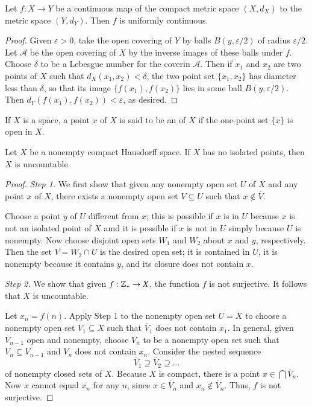 \documentclass[12pt, a4paper, oneside, openright, titlepage]{book}
\begin{document}
\begin{theorem}
    Let $f:X\rightarrow Y$ be a continuous map of the compact metric space $(X,d_X)$ to the metric space $(Y,d_Y)$. Then $f$ is uniformly continuous.
\end{theorem}
\begin{proof}
    Given $\varepsilon >0$, take the open covering of $Y$ by balls $B(y,\varepsilon/2)$ of radius $\varepsilon/2$. Let $\mathcal{A}$ be the open covering of $X$ by the inverse images of these balls under $f$. Choose $\delta$ to be a Lebesgue number for the coverin $\mathcal{A}$. Then if $x_1$ and $x_2$ are two points of $X$ such that $d_X(x_1,x_2) < \delta$, the two point set $\{x_1,x_2\}$ has diameter less than $\delta$, so that its image $\{f(x_1),f(x_2)\}$ lies in some ball $B(y,\varepsilon/2)$. Then $d_Y(f(x_1),f(x_2)) < \varepsilon$, as desired.
\end{proof}

\begin{definition}
    If $X$ is a space, a point $x$ of $X$ is said to be an  of $X$ if the one-point set $\{x\}$ is open in $X$.
\end{definition}


\begin{theorem}
    Let $X$ be a nonempty compact Hausdorff space. If $X$ has no isolated points, then $X$ is uncountable.
\end{theorem}
\begin{proof}
    \emph{Step 1.} We first show that given any nonempty open set $U$ of $X$ and any point $x$ of $X$, there exists a nonempty open set $V \subseteq U$ such that $x \notin \overline{V}$.

    Choose a point $y$ of $U$ different from $x$; this is possible if $x$ is in $U$ because $x$ is not an isolated point of $X$ amd it is possible if $x$ is not in $U$ simply because $U$ is nonempty. Now choose disjoint open sets $W_1$ and $W_2$ about $x$ and $y$, respectively. Then the set $V = W_2 \cap U$ is the desired open set; it is contained in $U$, it is nonempty because it contains $y$, and its closure does not contain $x$.

    \emph{Step 2.} We show that given $f:\mathbb Z_+\rightarrow X$, the function $f$ is not surjective. It follows that $X$ is uncountable.

    Let $x_n = f(n)$. Apply Step 1 to the nonempty open set $U = X$ to choose a nonempty open set $V_1 \subseteq X$ such that $\overline{V}_1$ does not contain $x_1$. In general, given $V_{n-1}$ open and nonempty, choose $V_n$ to be a nonempty open set such that $V_n \subseteq V_{n-1}$ and $V_n$ does not contain $x_n$. Consider the nested sequence \begin{equation*}
        \overline{V}_1\supseteq \overline{V}_2\supseteq ...
    \end{equation*}
    of nonempty closed sets of $X$. Because $X$ is compact, there is a point $x \in \bigcap\overline{V}_n$. Now $x$ cannot equal $x_n$ for any $n$, since $x \in \overline{V}_n$ and $x_n \notin \overline{V}_n$. Thus, $f$ is not surjective.
\end{proof}
\end{document}
